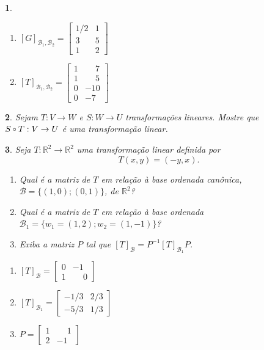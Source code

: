 \documentclass[12pt]{exam}
\newtheorem{exercicio}{}
\newcommand{\real}{\mathbb{R}}
\newcommand{\compcent}[1]{\vcenter{\hbox{$#1\circ$}}}
\newcommand{\comp}{\mathbin{\mathchoice
{\compcent\scriptstyle}{\compcent\scriptstyle}
{\compcent\scriptscriptstyle}{\compcent\scriptscriptstyle}}}
\begin{document}
\begin{exercicio}
\begin{solucao}
\begin{enumerate}[label=({\alph*})]
        \item $[G]_{\mathcal{B}_1, \mathcal{B}_2} = \begin{bmatrix}
          1/2 & 1\\
          3 & 5\\
          1 & 2
        \end{bmatrix}$

        \item $[T]_{\mathcal{B}_1, \mathcal{B}_2} = \begin{bmatrix}
          1 & \phantom{-}7\\
          1 & \phantom{-}5\\
          0 & -10\\
          0 & -7
        \end{bmatrix}$
      \end{enumerate}
    \end{solucao}
\end{exercicio}

\begin{exercicio}
  Sejam $T : V \to W$ e $S : W \to U$ transforma\c{c}\~oes lineares. Mostre que $S \comp T : V \to U$ \'e uma transforma\c{c}\~ao linear.
\end{exercicio}

\begin{exercicio}
  Seja $T : \real^2 \to \real^2$ uma transforma\c{c}\~ao linear definida por
  \[
    T(x,y) = (-y,x).
  \]
  \begin{enumerate}[label=({\alph*})]
    \item Qual \'e a matriz de $T$ em rela\c{c}\~ao \`a base ordenada can\^onica, $\mathcal{B} = \{(1,0); (0,1)\}$, de $\real^2$?
    \item Qual \'e a matriz de $T$ em rela\c{c}\~ao \`a base ordenada $\mathcal{B}_1 = \{w_1 = (1,2); w_2 = (1,-1)\}$?
    \item Exiba a matriz $P$ tal que $[T]_{\mathcal{B}} = P^{-1}[T]_{\mathcal{B}_1}P$.
  \end{enumerate}
  \begin{solucao}
    \begin{enumerate}[label=({\alph*})]
      \item $[T]_\mathcal{B} = \begin{bmatrix}
        0 & -1\\
        1 & \phantom{-}0
      \end{bmatrix}$
      \item $[T]_{\mathcal{B}_1} = \begin{bmatrix}
        -1/3 & 2/3\\
        -5/3 & 1/3
      \end{bmatrix}$
      \item $P = \begin{bmatrix}
        1 & \phantom{-}1\\
        2 & -1
      \end{bmatrix}$
    \end{enumerate}
  \end{solucao}
\end{exercicio}
\end{document}
